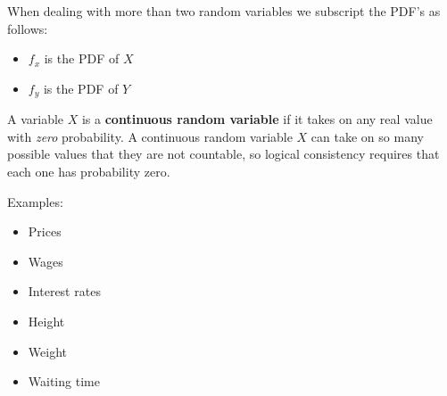 \documentclass[11pt]{article}
\begin{document}
\newpage

When dealing with more than two random variables we subscript the PDF's as follows:

\begin{itemize}
 \item $f_{x}$ is the PDF of $X$
 \item $f_{y}$ is the PDF of $Y$
\end{itemize}

\vspace{2mm}

A variable $X$ is a \textbf{continuous random variable} if it takes on any real value with \emph{zero}
probability. A continuous random variable $X$ can take on so many possible values that they are not 
countable, so logical consistency requires that each one has probability zero.

\vspace{2mm}

Examples:

\begin{itemize}
 \item Prices
 \item Wages
 \item Interest rates
 \item Height
 \item Weight
 \item Waiting time
\end{itemize} 
\end{document}
